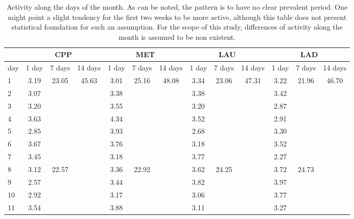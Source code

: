 \documentclass[%
 aip,
 jmp,%
 amsmath,amssymb,
 reprint,%
]{revtex4-1}
\begin{document}
\begin{table}
    \caption{Activity along the days of the month. As can be noted, the pattern is to have no clear prevalent period. One might point a slight tendency for the first two weeks to be more active, although this table does not present statistical foundation for such an assumption. For the scope of this study, differences of activity along the month is assumed to be non existent.}
\begin{center}
    \begin{tabular}{ |l|| c|c|c| c|c|c| c|c|c| c|c|c|}
        \hline
    & \multicolumn{3}{c|}{CPP} & \multicolumn{3}{c|}{MET} & \multicolumn{3}{c|}{LAU} & \multicolumn{3}{c|}{LAD}  \\ \hline
day    & 1 day & 7 days & 14 days &   1 day & 7 days & 14 days &   1 day & 7 days & 14 days &   1 day & 7 days & 14 days \\ \hline\hline
1  & 3.19 & \multirow{7}{*}{23.05} & \multirow{14}{*}{45.63} & 3.01 & \multirow{7}{*}{25.16} & \multirow{14}{*}{48.08} & 3.34 & \multirow{7}{*}{23.06} &  \multirow{14}{*}{47.31} & 3.22 & \multirow{7}{*}{21.96} & \multirow{14}{*}{46.70} \\
2  & 3.07 &                        &                         & 3.38  & & &  3.38 & & & 3.42 & & \\
3  & 3.20 &                        &                         & 3.55  & & & 3.20 & & & 2.87 & & \\
4  & 3.63 &                        &                         & 4.34  & & & 3.52 & & & 2.91 & & \\
5  & 2.85 &                        &                         & 3.93  & & &  2.68 & & & 3.30 & & \\
6  & 3.67 &                        &                         & 3.76  & & & 3.18 & & & 3.52 & & \\
7  & 3.45 &                        &                         & 3.18  & & & 3.77 & & & 2.27 & & \\\cline{3-3}\cline{6-6}\cline{9-9}\cline{12-12}
8  & 3.12 & \multirow{7}{*}{22.57} &                         & 3.36  & \multirow{7}{*}{22.92} & & 3.62 & \multirow{7}{*}{24.25} & & 3.72 & \multirow{7}{*}{24.73} &  \\
9  & 2.57 &                        &                         & 3.44  & & & 3.82 & & & 3.97 & & \\
10  & 2.92 &                        &                         & 3.17  & & & 3.06 & & & 3.77 & & \\
11  & 3.54 &                        &                         & 3.88  & & & 3.11 & & & 3.27 & & \\

\end{tabular}
\end{center}
\end{table}
\end{document}
